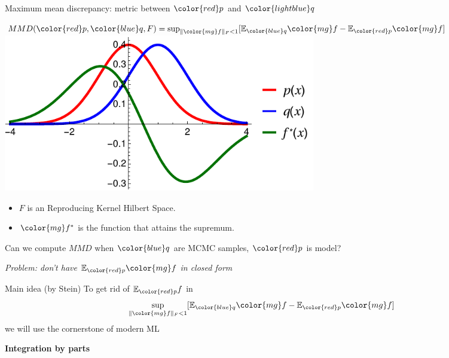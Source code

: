 \documentclass{beamer}
\begin{document}
 \begin{frame}{Maximum mean discrepancy: metric between ${ \color{red} p}$ and ${\color{lightblue} q}$ }
 \begin{center}
$MMD({\color{red} p},{ \color{blue} q},F) = \sup_{   \| {\color{mg}f} \|_F<1} [\ev_{{ \color{blue} q}}{\color{mg}f}- \ev_{{\color{red} p}}{\color{mg} f}]  $\\
\vspace{0.5cm}
 \includegraphics[width=0.6\textwidth]{./img/mmd.pdf} 
 \end{center}
 \begin{itemize}
  \item $F$ is an Reproducing Kernel Hilbert Space.
  \item ${\color{mg} f^*}$ is the function that attains the supremum.
 \end{itemize}

Can we compute $MMD$ when ${\color{blue} q}$ are MCMC samples, ${\color{red} p}$ is model?

\pause

 \vspace{0.1cm}
\begin{center}
 {\large\emph{ {\color{red} Problem:} don't have $\ev_{{\color{red} p}}{\color{mg} f}$ in closed form }}
 \end{center}
 
 \end{frame} 
 
 
 
 \begin{frame}{Main idea (by Stein)}
To get rid of $\ev_{ {\color{red} p} }f$  in $$ \sup_{    \| {\color{mg}f} \|_F<1} [\ev_{{ \color{blue} q}}{\color{mg}f}- \ev_{{\color{red} p}} {\color{mg}f}] $$we will use the cornerstone of modern ML

\pause
\textbf{Integration by parts}






\end{frame} 
\end{document}
